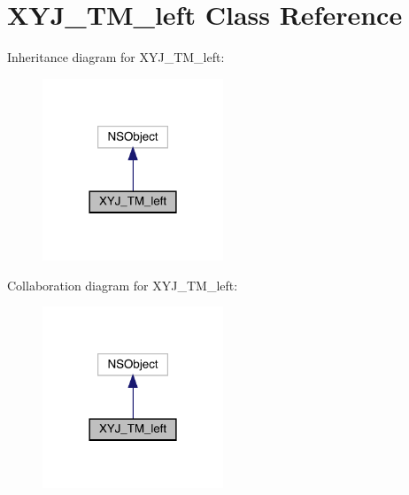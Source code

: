 \hypertarget{interface_x_y_j___t_m__left}{}\section{X\+Y\+J\+\_\+\+T\+M\+\_\+left Class Reference}
\label{interface_x_y_j___t_m__left}


Inheritance diagram for X\+Y\+J\+\_\+\+T\+M\+\_\+left\+:\nopagebreak
\begin{figure}[H]
\begin{center}
\leavevmode
\includegraphics[width=153pt]{interface_x_y_j___t_m__left__inherit__graph}
\end{center}
\end{figure}


Collaboration diagram for X\+Y\+J\+\_\+\+T\+M\+\_\+left\+:\nopagebreak
\begin{figure}[H]
\begin{center}
\leavevmode
\includegraphics[width=153pt]{interface_x_y_j___t_m__left__coll__graph}
\end{center}
\end{figure}
